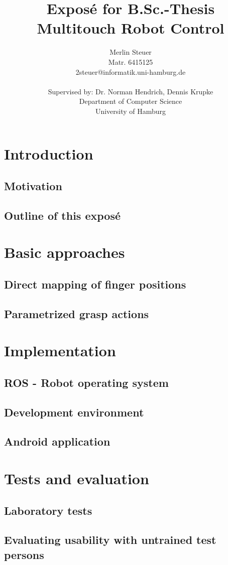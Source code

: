 \documentclass[a4paper]{article}
\title{Exposé for B.Sc.-Thesis \\
Multitouch Robot Control}
\author{Merlin Steuer \\ Matr. 6415125 \\ 2steuer@informatik.uni-hamburg.de \\
\\ Supervised by: Dr. Norman Hendrich, Dennis Krupke \\ 
Department of Computer Science \\ 
University of Hamburg}
\begin{document}
\maketitle

\tableofcontents

\pagebreak

\section{Introduction}
\subsection{Motivation}

\subsection{Outline of this exposé}

\section{Basic approaches}

\subsection{Direct mapping of finger positions}

\subsection{Parametrized grasp actions}

\section{Implementation}

\subsection{ROS - Robot operating system}

\subsection{Development environment}

\subsection{Android application}

\section{Tests and evaluation}

\subsection{Laboratory tests}

\subsection{Evaluating usability with untrained test persons}

\pagebreak



\end{document}

